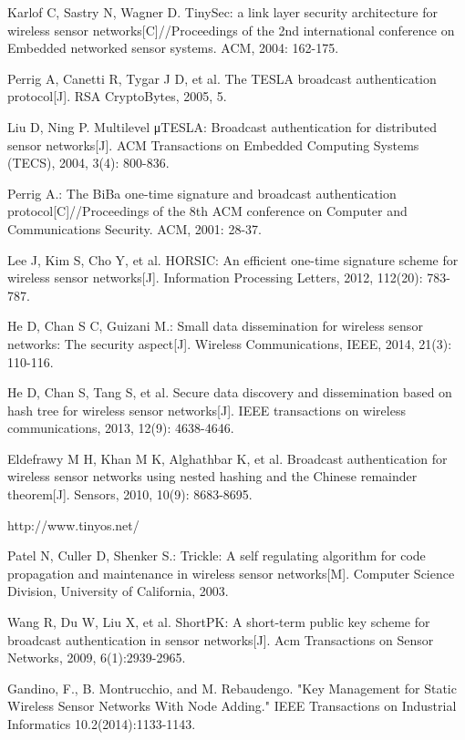 \documentclass{sig-alternate-05-2015}
\begin{document}
\begin{thebibliography}{13}

 Karlof C, Sastry N, Wagner D. TinySec: a link layer security architecture for wireless sensor networks[C]//Proceedings of the 2nd international conference on Embedded networked sensor systems. ACM, 2004: 162-175.

 Perrig A, Canetti R, Tygar J D, et al. The TESLA broadcast authentication protocol[J]. RSA CryptoBytes, 2005, 5.

Liu D, Ning P. Multilevel μTESLA: Broadcast authentication for distributed sensor networks[J]. ACM Transactions on Embedded Computing Systems (TECS), 2004, 3(4): 800-836.

 Perrig A.: The BiBa one-time signature and broadcast authentication protocol[C]//Proceedings of the 8th ACM conference on Computer and Communications Security. ACM, 2001: 28-37.

 Lee J, Kim S, Cho Y, et al. HORSIC: An efficient one-time signature scheme for wireless sensor networks[J]. Information Processing Letters, 2012, 112(20): 783-787.

 He D, Chan S C, Guizani M.: Small data dissemination for wireless sensor networks: The security aspect[J]. Wireless Communications, IEEE, 2014, 21(3): 110-116.

 He D, Chan S, Tang S, et al. Secure data discovery and dissemination based on hash tree for wireless sensor networks[J]. IEEE transactions on wireless communications, 2013, 12(9): 4638-4646.

 Eldefrawy M H, Khan M K, Alghathbar K, et al. Broadcast authentication for wireless sensor networks using nested hashing and the Chinese remainder theorem[J]. Sensors, 2010, 10(9): 8683-8695.

 http://www.tinyos.net/

 Patel N, Culler D, Shenker S.: Trickle: A self regulating algorithm for code propagation and maintenance in wireless sensor networks[M]. Computer Science Division, University of California, 2003.

 Wang R, Du W, Liu X, et al. ShortPK: A short-term public key scheme for broadcast authentication in sensor networks[J]. Acm Transactions on Sensor Networks, 2009, 6(1):2939-2965.

 Gandino, F., B. Montrucchio, and M. Rebaudengo. "Key Management for Static Wireless Sensor Networks With Node Adding." IEEE Transactions on Industrial Informatics 10.2(2014):1133-1143.

\end{thebibliography}
\end{document}
